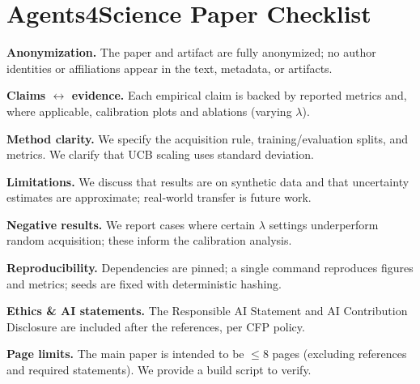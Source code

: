 \section*{Agents4Science Paper Checklist}

\textbf{Anonymization.} The paper and artifact are fully anonymized; no author identities or affiliations appear in the text, metadata, or artifacts.

\textbf{Claims $\leftrightarrow$ evidence.} Each empirical claim is backed by reported metrics and, where applicable, calibration plots and ablations (varying $\lambda$).

\textbf{Method clarity.} We specify the acquisition rule, training/evaluation splits, and metrics. We clarify that UCB scaling uses standard deviation.

\textbf{Limitations.} We discuss that results are on synthetic data and that uncertainty estimates are approximate; real‑world transfer is future work.

\textbf{Negative results.} We report cases where certain $\lambda$ settings underperform random acquisition; these inform the calibration analysis.

\textbf{Reproducibility.} Dependencies are pinned; a single command reproduces figures and metrics; seeds are fixed with deterministic hashing.

\textbf{Ethics \& AI statements.} The Responsible AI Statement and AI Contribution Disclosure are included after the references, per CFP policy.

\textbf{Page limits.} The main paper is intended to be $\leq 8$ pages (excluding references and required statements). We provide a build script to verify.
